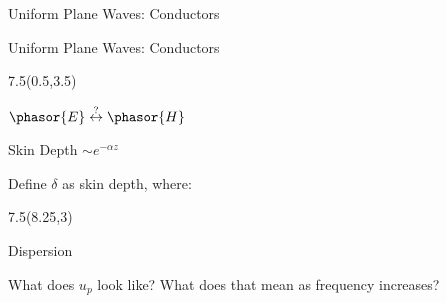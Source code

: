 \begin{lesson36}
\begin{frame}{Uniform Plane Waves: Conductors}
\end{frame}
\begin{frame}{Uniform Plane Waves: Conductors}
\begin{textblock}{7.5}(0.5,3.5) 
\begin{myblock}[0.95]{$\phasor{E}\overset{\text{?}}{\leftrightarrow}\phasor{H}$}
\begin{small}
\vspace{-8pt}
\end{small}
\end{myblock}
\begin{myblock}[0.95]{Skin Depth $\sim e^{-\alpha z}$}
	\begin{small}
		Define $\delta$ as skin depth, where: 
		\vspace{-8pt}
	\end{small}
\end{myblock}
\end{textblock}

\begin{textblock}{7.5}(8.25,3)
\begin{myblock}[0.95]{Dispersion}
	\begin{small}
		What does $u_p$ look like?
		\vspace{-8pt}
		\eq{
			u_p &=\dfrac{\omega}{\beta} = \dfrac{\omega}{\sqrt{\frac{\omega\mu\sigma}{2}}} = \sqrt{\dfrac{2\omega}{\mu\sigma}} 
		} 
		What does that mean as frequency increases?
	\end{small}
\end{myblock}
\end{textblock}

\end{frame}

\end{lesson36}

